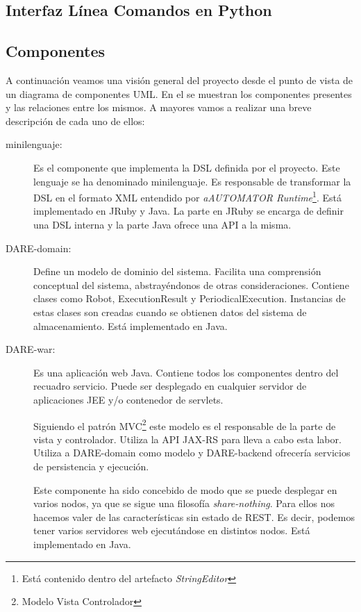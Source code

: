 \subsection{Interfaz Línea Comandos en Python}

\subsection{Componentes}
\label{COMPONENTES-DARE}
A continuación veamos una visión general del proyecto desde el punto
de vista de un diagrama de componentes UML. En el se muestran los
componentes presentes y las relaciones entre los mismos. A mayores
vamos a realizar una breve descripción de cada uno de ellos:

\begin{description}

\item[minilenguaje:] Es el componente que implementa la DSL definida
  por el proyecto. Este lenguaje se ha denominado minilenguaje. Es
  responsable de transformar la DSL en el formato XML entendido por
  \emph{aAUTOMATOR Runtime}\footnote{Está contenido dentro del
    artefacto \emph{StringEditor}}. Está implementado en JRuby y
  Java. La parte en JRuby se encarga de definir una DSL interna y la
  parte Java ofrece una API a la misma.
\item[DARE-domain:] Define un modelo de dominio del sistema. Facilita
  una comprensión conceptual del sistema, abstrayéndonos de otras
  consideraciones. Contiene clases como Robot, ExecutionResult y
  PeriodicalExecution. Instancias de estas clases son creadas cuando
  se obtienen datos del sistema de almacenamiento. Está implementado
  en Java.
\item[DARE-war:] Es una aplicación web Java. Contiene todos los
  componentes dentro del recuadro servicio. Puede ser desplegado en
  cualquier servidor de aplicaciones JEE y/o contenedor de servlets.

  Siguiendo el patrón MVC\footnote{Modelo Vista Controlador} este
  modelo es el responsable de la parte de vista y controlador. Utiliza
  la API JAX-RS para lleva a cabo esta labor. Utiliza a DARE-domain
  como modelo y DARE-backend ofrecería servicios de persistencia y
  ejecución.

  Este componente ha sido concebido de modo que se puede desplegar en
  varios nodos, ya que se sigue una filosofía
  \emph{share-nothing}. Para ellos nos hacemos valer de las
  características sin estado de REST. Es decir, podemos tener varios
  servidores web ejecutándose en distintos nodos. Está implementado en
  Java.


\end{description}
